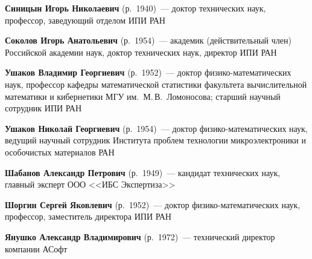 \begin{multicols}{2}
\vspace*{5pt}

\noindent
\textbf{Синицын Игорь Николаевич} (р.\ 1940)~--- доктор технических наук, 
профессор, заведующий отделом ИПИ РАН

\vspace*{5pt}

\noindent 
\textbf{Соколов Игорь Анатольевич} (р.\ 1954)~---
академик (действительный член) Российской академии наук,
доктор технических наук, директор ИПИ РАН

\vspace*{5pt}

\noindent
\textbf{Ушаков Владимир Георгиевич} (р.\ 1952)~--- доктор физико-математических наук,
профессор кафедры математической статистики факультета вычислительной математики и кибернетики МГУ
им.\ М.\,В.~Ломоносова; старший научный сотрудник ИПИ РАН

\vspace*{5pt}

\noindent
\textbf{Ушаков Николай Георгиевич} (р.\ 1954)~--- доктор фи\-зи\-ко-математических наук,
ведущий научный сотрудник Института проблем технологии микроэлектроники
и особочистых материалов РАН

\vspace*{5pt}

\noindent
\textbf{Шабанов Александр Петрович} (р.\ 1949)~---  
кандидат технических наук, главный эксперт ООО <<ИБС Экспертиза>>

\vspace*{5pt}

\noindent
\textbf{Шоргин Сергей Яковлевич} (р.\ 1952)~--- доктор 
фи\-зи\-ко-математических наук, профессор, заместитель директора ИПИ РАН 

\vspace*{5pt}

\noindent
\textbf{Янушко Александр Владимирович} (р.\ 1972)~--- технический директор компании АСофт


\end{multicols}


\newpage
